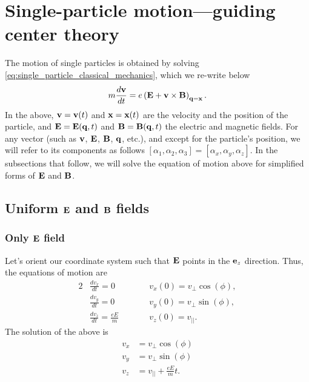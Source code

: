 \documentclass[oneside,a4paper,11pt]{report}
\begin{document}
\chapter{Single-particle motion---guiding center theory}
The motion of single particles is obtained by solving \cref{eq:single_particle_classical_mechanics}, which we re-write below
\begin{equation}
\label{eq:single_particle_motion}
    m \frac{d \mathbf{v}}{dt} = e \left ( \mathbf{E} + \mathbf{v} \times \mathbf{B} \right )_{\mathbf{q} = \mathbf{x}}.
\end{equation}
In the above, $\mathbf{v} = \mathbf{v}(t)$ and $\mathbf{x} = \mathbf{x}(t)$ are the velocity and the position of the particle, and $\mathbf{E} = \mathbf{E}(\mathbf{q},t)$ and $\mathbf{B} = \mathbf{B}(\mathbf{q},t)$ the electric and magnetic fields. For any vector (such as $\mathbf{v}$, $\mathbf{E}$, $\mathbf{B}$, $\mathbf{q}$, etc.), and except for the particle's position, we will refer to its components as follows $[\alpha_1,\alpha_2,\alpha_3] = [\alpha_x,\alpha_y,\alpha_z]$. In the subsections that follow, we will solve the equation of motion above for simplified forms of $\mathbf{E}$ and $\mathbf{B}$. 
 
\section{Uniform $\mathbf{E}$ and $\mathbf{B}$ fields}

\subsection{Only $\mathbf{E}$ field}
Let's orient our coordinate system such that $\mathbf{E}$ points in the $\mathbf{e}_z$ direction. Thus, the equations of motion are
\begin{alignat}{2}
    &\frac{d v_x}{dt} = 0  \qquad && v_x(0) = v_\perp \cos(\phi), \nonumber \\
    &\frac{d v_y}{dt} = 0  \qquad && v_y(0) = v_\perp \sin(\phi), \nonumber \\
    &\frac{d v_z}{dt} = \frac{e E}{m}  \qquad && v_z(0) = v_{||}.
\end{alignat}
The solution of the above is
\begin{align}
    v_x &= v_\perp \cos(\phi) \nonumber \\
    v_y &= v_\perp \sin(\phi) \nonumber \\
    v_z &= v_{||} + \frac{e E}{m} t.
\end{align}
\end{document}
